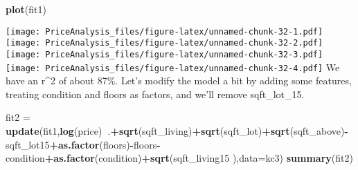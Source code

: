 \documentclass[]{article}
\newenvironment{Shaded}{\begin{snugshade}}{\end{snugshade}}
\newcommand{\KeywordTok}[1]{\textcolor[rgb]{0.13,0.29,0.53}{\textbf{#1}}}
\newcommand{\DataTypeTok}[1]{\textcolor[rgb]{0.13,0.29,0.53}{#1}}
\newcommand{\StringTok}[1]{\textcolor[rgb]{0.31,0.60,0.02}{#1}}
\newcommand{\OperatorTok}[1]{\textcolor[rgb]{0.81,0.36,0.00}{\textbf{#1}}}
\newcommand{\NormalTok}[1]{#1}
\begin{document}
\begin{Shaded}
\begin{Highlighting}[]
\KeywordTok{plot}\NormalTok{(fit1)}
\end{Highlighting}
\end{Shaded}

\texttt{[image: PriceAnalysis\_files/figure-latex/unnamed-chunk-32-1.pdf]}
\texttt{[image: PriceAnalysis\_files/figure-latex/unnamed-chunk-32-2.pdf]}
\texttt{[image: PriceAnalysis\_files/figure-latex/unnamed-chunk-32-3.pdf]}
\texttt{[image: PriceAnalysis\_files/figure-latex/unnamed-chunk-32-4.pdf]}
We have an r\^{}2 of about 87\%. Let's modify the model a bit by adding
some features, treating condition and floors as factors, and we'll
remove sqft\_lot\_15.

\begin{Shaded}
\begin{Highlighting}[]
\NormalTok{fit2 =}\StringTok{ }\KeywordTok{update}\NormalTok{(fit1,}\KeywordTok{log}\NormalTok{(price)}\OperatorTok{~}\NormalTok{.}\OperatorTok{+}\KeywordTok{sqrt}\NormalTok{(sqft_living)}\OperatorTok{+}\KeywordTok{sqrt}\NormalTok{(sqft_lot)}\OperatorTok{+}\KeywordTok{sqrt}\NormalTok{(sqft_above)}\OperatorTok{-}\NormalTok{sqft_lot15}\OperatorTok{+}\KeywordTok{as.factor}\NormalTok{(floors)}\OperatorTok{-}\NormalTok{floors}\OperatorTok{-}\NormalTok{condition}\OperatorTok{+}\KeywordTok{as.factor}\NormalTok{(condition)}\OperatorTok{+}\KeywordTok{sqrt}\NormalTok{(sqft_living15 ),}\DataTypeTok{data=}\NormalTok{kc3)}
\KeywordTok{summary}\NormalTok{(fit2)}
\end{Highlighting}
\end{Shaded}
\end{document}
